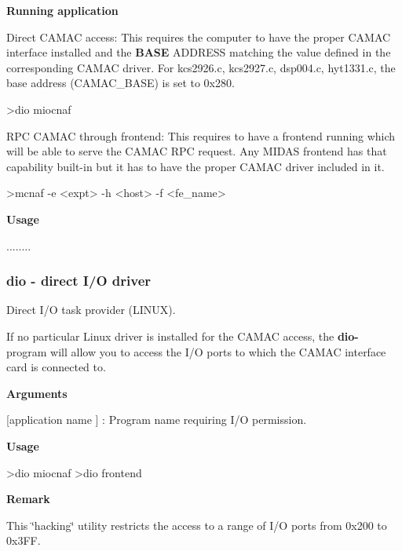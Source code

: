 \begin{DoxyItemize}
\item {\bfseries  Running application }
\begin{DoxyItemize}
\item Direct CAMAC access: This requires the computer to have the proper CAMAC interface installed and the {\bfseries BASE} ADDRESS matching the value defined in the corresponding CAMAC driver. For kcs2926.c, kcs2927.c, dsp004.c, hyt1331.c, the base address (CAMAC\_\-BASE) is set to 0x280. 
\begin{DoxyCode}
   >dio miocnaf
\end{DoxyCode}

\item RPC CAMAC through frontend: This requires to have a frontend running which will be able to serve the CAMAC RPC request. Any MIDAS frontend has that capability built-\/in but it has to have the proper CAMAC driver included in it. 
\begin{DoxyCode}
     >mcnaf -e <expt> -h <host> -f <fe_name>
\end{DoxyCode}

\end{DoxyItemize}
\end{DoxyItemize}


\begin{DoxyItemize}
\item {\bfseries  Usage } 
\begin{DoxyCode}
  ........
\end{DoxyCode}

\end{DoxyItemize}



 \hypertarget{FE_utils_FE_dio_utility}{}\subsubsection{dio          -\/ direct I/O driver}\label{FE_utils_FE_dio_utility}
Direct I/O task provider (LINUX).

If no particular Linux driver is installed for the CAMAC access, the {\bfseries dio-\/} program will allow you to access the I/O ports to which the CAMAC interface card is connected to.


\begin{DoxyItemize}
\item {\bfseries  Arguments }
\begin{DoxyItemize}
\item \mbox{[}application name \mbox{]} : Program name requiring I/O permission.
\end{DoxyItemize}
\item {\bfseries  Usage } 
\begin{DoxyCode}
 >dio miocnaf
 >dio frontend 
\end{DoxyCode}

\item {\bfseries  Remark }
\item This \char`\"{}hacking\char`\"{} utility restricts the access to a range of I/O ports from 0x200 to 0x3FF.
\end{DoxyItemize}


